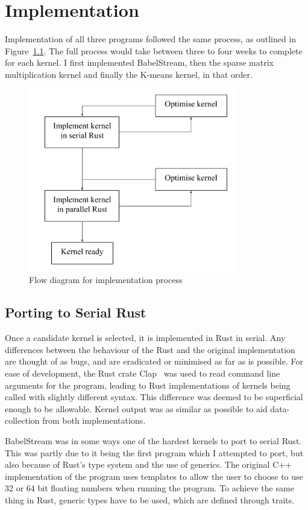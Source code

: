 \chapter{Implementation}
Implementation of all three programs followed the same process, as outlined in Figure~\ref{fig:imp-flow}. The full process would take between three to four weeks to complete for each kernel. I first implemented BabelStream, then the sparse matrix multiplication kernel and finally the K-means kernel, in that order.

\begin{figure}
  \center
  \includegraphics[height=8cm]{figs/ImplementationFlow.png}
  \caption{Flow diagram for implementation process}
  \label{fig:imp-flow}
\end{figure}

\section{Porting to Serial Rust}
Once a candidate kernel is selected, it is implemented in Rust in serial. Any differences between the  behaviour of the Rust and the original implementation are thought of as bugs, and are eradicated or minimised as far as is possible. For ease of development, the Rust crate Clap~\cite{RustClap} was used to read command line arguments for the program, leading to Rust implementations of kernels being called with slightly different syntax. This difference was deemed to be superficial enough to be allowable. Kernel output was as similar as possible to aid data-collection from both implementations.

BabelStream was in some ways one of the hardest kernels to port to serial Rust. This was partly due to it being the first program which I attempted to port, but also because of Rust's type system and the use of generics. The original C++ implementation of the program uses templates to allow the user to choose to use 32 or 64 bit floating numbers when running the program. To achieve the same thing in Rust, generic types have to be used, which are defined through traits.

